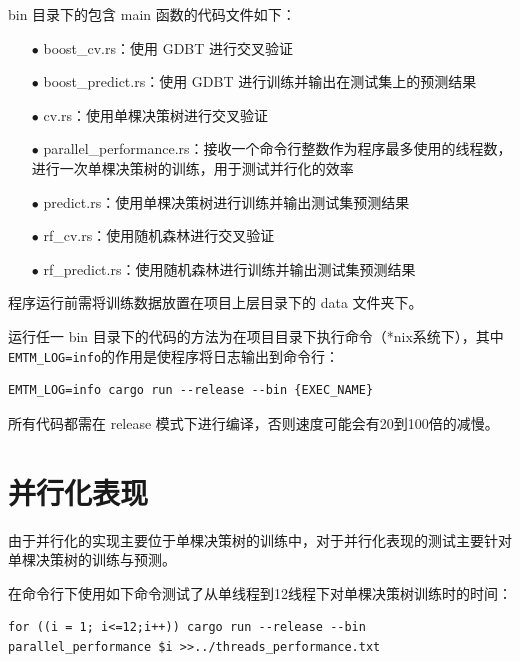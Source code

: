 \documentclass[12pt]{article}
\begin{document}
bin 目录下的包含 main 函数的代码文件如下：
\begin{enumerate}
    \item[$\bullet$] boost\_cv.rs：使用 GDBT 进行交叉验证
    \item[$\bullet$] boost\_predict.rs：使用 GDBT 进行训练并输出在测试集上的预测结果
    \item[$\bullet$] cv.rs：使用单棵决策树进行交叉验证
    \item[$\bullet$] parallel\_performance.rs：接收一个命令行整数作为程序最多使用的线程数，进行一次单棵决策树的训练，用于测试并行化的效率
    \item[$\bullet$] predict.rs：使用单棵决策树进行训练并输出测试集预测结果
    \item[$\bullet$] rf\_cv.rs：使用随机森林进行交叉验证
    \item[$\bullet$] rf\_predict.rs：使用随机森林进行训练并输出测试集预测结果
\end{enumerate}

程序运行前需将训练数据放置在项目上层目录下的 data 文件夹下。

运行任一 bin 目录下的代码的方法为在项目目录下执行命令（*nix系统下），其中\lstinline{EMTM_LOG=info}的作用是使程序将日志输出到命令行：
\begin{lstlisting}
EMTM_LOG=info cargo run --release --bin {EXEC_NAME}
\end{lstlisting}

所有代码都需在 release 模式下进行编译，否则速度可能会有20到100倍的减慢。


\section{并行化表现}

由于并行化的实现主要位于单棵决策树的训练中，对于并行化表现的测试主要针对单棵决策树的训练与预测。

在命令行下使用如下命令测试了从单线程到12线程下对单棵决策树训练时的时间：
\begin{lstlisting}
for ((i = 1; i<=12;i++)) cargo run --release --bin parallel_performance $i >>../threads_performance.txt
\end{lstlisting}
\end{document}

